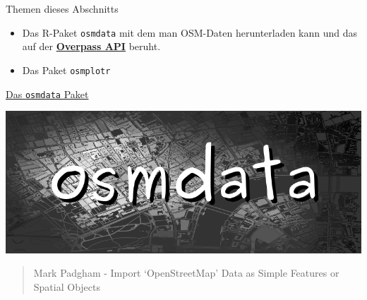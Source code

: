 \documentclass[ignorenonframetext,]{beamer}
\begin{document}
\begin{frame}[fragile]{Themen dieses Abschnitts}

\begin{itemize}
\item
  Das R-Paket \texttt{osmdata} mit dem man OSM-Daten herunterladen kann
  und das auf der
  \href{https://wiki.openstreetmap.org/wiki/Overpass_API}{\textbf{Overpass
  API}} beruht.
\item
  Das Paket \texttt{osmplotr}
\end{itemize}

\end{frame}

\begin{frame}{\href{https://github.com/ropensci/osmdata}{Das
\texttt{osmdata} Paket}}

\includegraphics{figure/osmdatatitle.png}

\begin{quote}
Mark Padgham - Import `OpenStreetMap' Data as Simple Features or Spatial
Objects
\end{quote}

\end{frame}
\end{document}
